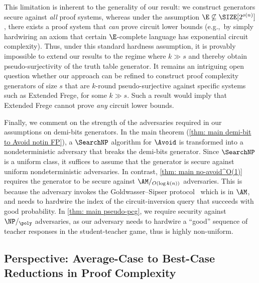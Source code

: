 This limitation is inherent to the generality of our result: we construct generators secure against \emph{all} proof systems, whereas under the assumption $\E\not\subseteq \SIZE[2^{o(n)}]$, there exists a proof system that \emph{can} prove circuit lower bounds (e.g.,~by simply hardwiring an axiom that certain $\E$-complete language has exponential circuit complexity). Thus, under this standard hardness assumption, it is provably impossible to extend our results to the regime where $k \gg s$ and thereby obtain pseudo-surjectivity of the truth table generator. It remains an intriguing open question whether our approach can be refined to construct proof complexity generators of size $s$ that are $k$-round pseudo-surjective against specific systems such as Extended Frege, for some $k \gg s$. Such a result would imply that Extended Frege cannot prove \emph{any} circuit lower bounds.












Finally, we comment on the strength of the adversaries required in our assumptions on demi-bits generators. In the main theorem (\autoref{thm: main demi-bit to Avoid notin FP}), a $\SearchNP$ algorithm for $\Avoid$ is transformed into a nondeterministic adversary that breaks the demi-bits generator. Since $\SearchNP$ is a uniform class, it suffices to assume that the generator is secure against uniform nondeterministic adversaries. In contrast, \autoref{thm: main no-avoid^O(1)} requires the generator to be secure against $\AM/_{O(\log k(n))}$ adversaries. This is because the adversary invokes the Goldwasser--Sipser protocol~\cite{GS86} which is in $\AM$, and needs to hardwire the index of the circuit-inversion query that succeeds with good probability. In \autoref{thm: main pseudo-pcg}, we require security against $\NP/_\poly$ adversaries, as our adversary needs to hardwire a ``good'' sequence of teacher responses in the student-teacher game, thus is highly non-uniform.









\subsection{Perspective: Average-Case to Best-Case Reductions in Proof Complexity}\label{sec: perspective on best-case complexity}

